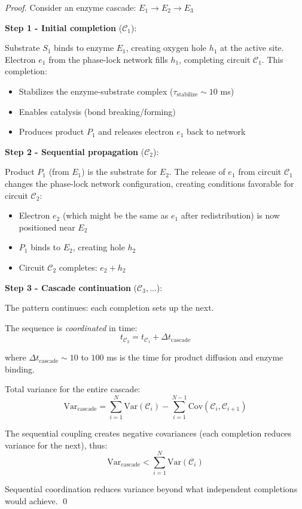 \begin{proof}
Consider an enzyme cascade: $E_1 \to E_2 \to E_3$

\textbf{Step 1 - Initial completion} ($\mathcal{C}_1$):

Substrate $S_1$ binds to enzyme $E_1$, creating oxygen hole $h_1$ at the active site. Electron $e_1$ from the phase-lock network fills $h_1$, completing circuit $\mathcal{C}_1$. This completion:
\begin{itemize}
\item Stabilizes the enzyme-substrate complex ($\tau_{\text{stabilize}} \sim 10$ ms)
\item Enables catalysis (bond breaking/forming)
\item Produces product $P_1$ and releases electron $e_1$ back to network
\end{itemize}

\textbf{Step 2 - Sequential propagation} ($\mathcal{C}_2$):

Product $P_1$ (from $E_1$) is the substrate for $E_2$. The release of $e_1$ from circuit $\mathcal{C}_1$ changes the phase-lock network configuration, creating conditions favorable for circuit $\mathcal{C}_2$:
\begin{itemize}
\item Electron $e_2$ (which might be the same as $e_1$ after redistribution) is now positioned near $E_2$
\item $P_1$ binds to $E_2$, creating hole $h_2$
\item Circuit $\mathcal{C}_2$ completes: $e_2 + h_2$
\end{itemize}

\textbf{Step 3 - Cascade continuation} ($\mathcal{C}_3, \ldots$):

The pattern continues: each completion sets up the next.

The sequence is \textit{coordinated} in time:
\begin{equation}
t_{\mathcal{C}_2} = t_{\mathcal{C}_1} + \Delta t_{\text{cascade}}
\end{equation}

where $\Delta t_{\text{cascade}} \sim 10$ to $100$ ms is the time for product diffusion and enzyme binding.

Total variance for the entire cascade:
\begin{equation}
\text{Var}_{\text{cascade}} = \sum_{i=1}^{N} \text{Var}(\mathcal{C}_i) - \sum_{i=1}^{N-1} \text{Cov}(\mathcal{C}_i, \mathcal{C}_{i+1})
\end{equation}

The sequential coupling creates negative covariances (each completion reduces variance for the next), thus:
\begin{equation}
\text{Var}_{\text{cascade}} < \sum_{i=1}^{N} \text{Var}(\mathcal{C}_i)
\end{equation}

Sequential coordination reduces variance beyond what independent completions would achieve. \qed
\end{proof}

